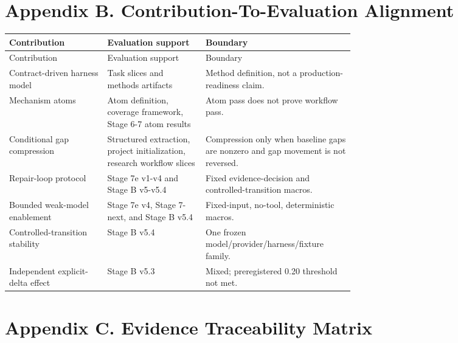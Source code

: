 \documentclass[11pt]{article}
\begin{document}
\section{Appendix B. Contribution-To-Evaluation Alignment}

{\small
\setlength{\tabcolsep}{3pt}
\begin{longtable}{>{\raggedright\arraybackslash}p{0.220\linewidth}>{\raggedright\arraybackslash}p{0.220\linewidth}>{\raggedright\arraybackslash}p{0.220\linewidth}}
\toprule
Contribution & Evaluation support & Boundary \\
\midrule
\endfirsthead
\toprule
Contribution & Evaluation support & Boundary \\
\midrule
\endhead
Contract-driven harness model & Task slices and methods artifacts & Method definition, not a production-readiness claim. \\
Mechanism atoms & Atom definition, coverage framework, Stage 6-7 atom results & Atom pass does not prove workflow pass. \\
Conditional gap compression & Structured extraction, project initialization, research workflow slices & Compression only when baseline gaps are nonzero and gap movement is not reversed. \\
Repair-loop protocol & Stage 7e v1-v4 and Stage B v5-v5.4 & Fixed evidence-decision and controlled-transition macros. \\
Bounded weak-model enablement & Stage 7e v4, Stage 7-next, and Stage B v5.4 & Fixed-input, no-tool, deterministic macros. \\
Controlled-transition stability & Stage B v5.4 & One frozen model/provider/harness/fixture family. \\
Independent explicit-delta effect & Stage B v5.3 & Mixed; preregistered 0.20 threshold not met. \\
\bottomrule
\end{longtable}
}

\section{Appendix C. Evidence Traceability Matrix}
\end{document}
